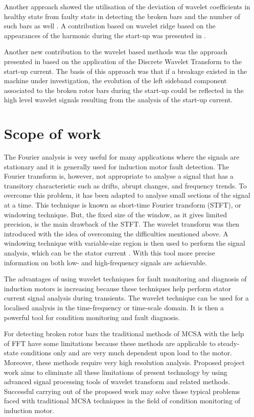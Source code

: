 \documentclass[a4paper,11pt]{report}
\begin{document}
Another approach showed the utilisation of the deviation of wavelet coefficients in healthy state from faulty state in detecting the broken bars and the number of such bars as well \cite{00976461}.
A contribution based on wavelet ridge based on the appearances of the harmonic during the start-up was presented in \cite{zhang}.

Another new contribution to the wavelet based methods was the approach presented in \cite{antonino} based on the application of the Discrete Wavelet Transform to the start-up current. The basis of this approach was that if a breakage existed in the machine under investigation, the evolution of the left sideband component associated to the broken rotor bars during the start-up could be reflected in the high level wavelet signals resulting from the analysis of the start-up current.

\section{Scope of work}
The Fourier analysis is very useful for many applications where the signals are stationary and it is generally used for induction motor fault detection. The Fourier transform is, however, not appropriate to analyse a signal that has a transitory characteristic such as drifts, abrupt changes, and frequency trends. To overcome this problem, it has been adapted to analyse small sections of the signal at a time. This technique is known as short-time Fourier transform (STFT), or windowing technique. But, the fixed size of the window, as it gives limited precision, is the main drawback of the STFT. The wavelet transform was then introduced with the idea of overcoming the difficulties mentioned above. A windowing technique with variable-size region is then used to perform the signal analysis, which can be the stator current \cite{00539845}. With this tool more precise information on both low- and high-frequency signals are achievable.

The advantages of using wavelet techniques for fault monitoring and diagnosis of induction motors is increasing because these techniques help perform stator current signal analysis during transients. The wavelet technique can be used for a localised analysis in the time-frequency or time-scale domain. It is then a powerful tool for condition monitoring and fault diagnosis.
     
For detecting broken rotor bars the traditional methods of MCSA with the help of FFT have some limitations because these methods are applicable to steady-state conditions only and are very much dependent upon load to the motor. Moreover, these methods require very high resolution analysis. Proposed project work aims to eliminate all these limitations of present technology by using advanced signal processing tools of wavelet transform and related methods. Successful carrying out of the proposed work may solve those typical problems faced with traditional MCSA techniques in the field of condition monitoring of induction motor.
\end{document}
